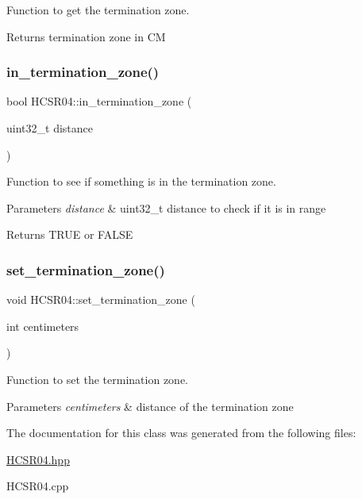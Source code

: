 Function to get the termination zone. 

\begin{DoxyReturn}{Returns}
termination zone in CM 
\end{DoxyReturn}
\mbox{\label{class_h_c_s_r04_a927ed3c322a83c02e4739ee2cc4b45a2}} 
\subsubsection{\texorpdfstring{in\+\_\+termination\+\_\+zone()}{in\_termination\_zone()}}
{\footnotesize\ttfamily bool H\+C\+S\+R04\+::in\+\_\+termination\+\_\+zone (\begin{DoxyParamCaption}\item[{uint32\+\_\+t}]{distance }\end{DoxyParamCaption})}



Function to see if something is in the termination zone. 


\begin{DoxyParams}{Parameters}
{\em distance} & uint32\+\_\+t distance to check if it is in range \\
\hline
\end{DoxyParams}
\begin{DoxyReturn}{Returns}
T\+R\+UE or F\+A\+L\+SE 
\end{DoxyReturn}
\mbox{\label{class_h_c_s_r04_aebbf05553e7818475e4846422088806e}} 
\subsubsection{\texorpdfstring{set\+\_\+termination\+\_\+zone()}{set\_termination\_zone()}}
{\footnotesize\ttfamily void H\+C\+S\+R04\+::set\+\_\+termination\+\_\+zone (\begin{DoxyParamCaption}\item[{int}]{centimeters }\end{DoxyParamCaption})}



Function to set the termination zone. 


\begin{DoxyParams}{Parameters}
{\em centimeters} & distance of the termination zone \\
\hline
\end{DoxyParams}


The documentation for this class was generated from the following files\+:\begin{DoxyCompactItemize}
\item 
\hyperlink{_h_c_s_r04_8hpp}{H\+C\+S\+R04.\+hpp}\item 
H\+C\+S\+R04.\+cpp\end{DoxyCompactItemize}
